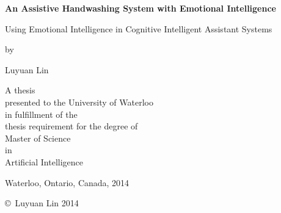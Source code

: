 
\pagestyle{empty}

\begin{titlepage}
        \begin{center}
        \vspace*{0.6cm}

        \Huge
        {\bf An Assistive Handwashing System with Emotional Intelligence }
        
        \vspace*{0.4cm}
        \LARGE
        Using Emotional Intelligence in Cognitive Intelligent Assistant Systems
        
        \vspace*{0.8cm}

        \normalsize
        by \\

        \vspace*{0.8cm}

        \Large
        Luyuan Lin \\

        \vspace*{2.8cm}

        \normalsize
        A thesis \\
        presented to the University of Waterloo \\ 
        in fulfillment of the \\
        thesis requirement for the degree of \\
        Master of Science \\
        in \\
        Artificial Intelligence \\

        \vspace*{1.6cm}

        Waterloo, Ontario, Canada, 2014 \\

        \vspace*{0.8cm}

        \copyright\ Luyuan Lin 2014 \\
        \end{center}
\end{titlepage}

